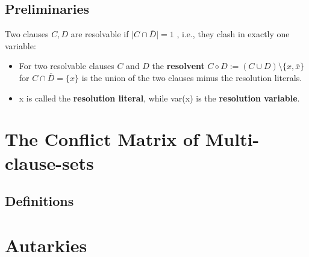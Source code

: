 \documentclass[12pt]{book}
\begin{document}
\section{Preliminaries}
\label{sec:Preliminaries}

\begin{defi}\label{def:Resolution}
 Two clauses $C,D$ are resolvable if $\mid C \cap \overline D \mid = 1$ , i.e., they clash in exactly one variable:
\begin{itemize}
 \item For two resolvable clauses $C$ and $D$ the \textbf{resolvent} $C \diamond D := (C \cup D) \setminus \{x, \overline x\} $ for $C \cap \overline D = \{ x \}$ is the union of the two clauses minus the resolution literals.
 \item x is called the \textbf{resolution literal}, while var(x) is the \textbf{resolution variable}.
 \end{itemize}
 \end{defi}

\chapter{The Conflict Matrix of Multi-clause-sets}
\label{cha:The Conflict Matrix of Multi-clause-sets}
\section{Definitions}
\label{sec:Definitions}


\chapter{Autarkies}
\label{cha:Autarkies}
\end{document}
